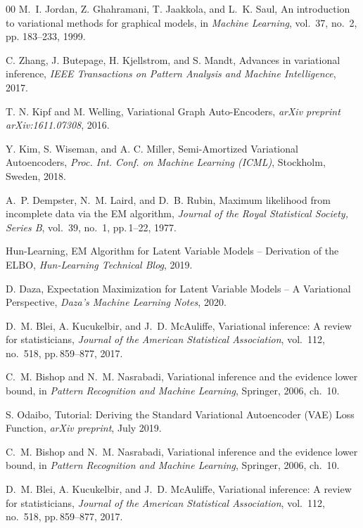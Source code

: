 \documentclass[final]{ws-ijseke}
\begin{document}
\begin{thebibliography}{00}
M.~I. Jordan, Z. Ghahramani, T. Jaakkola, and L.~K. Saul,
An introduction to variational methods for graphical models, in
{\it Machine Learning}, vol.~37, no.~2, pp. 183--233, 1999.

C. Zhang, J. Butepage, H. Kjellstrom, and S. Mandt,
Advances in variational inference,
{\it IEEE Transactions on Pattern Analysis and Machine Intelligence}, 2017.

T. N. Kipf and M. Welling,
Variational Graph Auto-Encoders,
{\it arXiv preprint arXiv:1611.07308}, 2016.

Y. Kim, S. Wiseman, and A. C. Miller,
Semi-Amortized Variational Autoencoders,
{\it Proc. Int. Conf. on Machine Learning (ICML)}, Stockholm, Sweden, 2018.

A.~P. Dempster, N.~M. Laird, and D.~B. Rubin,
Maximum likelihood from incomplete data via the EM algorithm,
{\it Journal of the Royal Statistical Society, Series B}, vol.~39, no.~1, pp. 1–22, 1977.

Hun-Learning,
EM Algorithm for Latent Variable Models – Derivation of the ELBO,
{\it Hun-Learning Technical Blog}, 2019.

D. Daza,
Expectation Maximization for Latent Variable Models – A Variational Perspective,
{\it Daza’s Machine Learning Notes}, 2020.

D.~M. Blei, A. Kucukelbir, and J.~D. McAuliffe,
Variational inference: A review for statisticians,
{\it Journal of the American Statistical Association}, vol.~112, no.~518, pp. 859–877, 2017.

C.~M. Bishop and N.~M. Nasrabadi,
Variational inference and the evidence lower bound, in
{\it Pattern Recognition and Machine Learning}, Springer, 2006, ch.~10.

S. Odaibo,
Tutorial: Deriving the Standard Variational Autoencoder (VAE) Loss Function,
{\it arXiv preprint}, July 2019.

C.~M. Bishop and N.~M. Nasrabadi,
Variational inference and the evidence lower bound, in
{\it Pattern Recognition and Machine Learning}, Springer, 2006, ch.~10.

D.~M. Blei, A. Kucukelbir, and J.~D. McAuliffe,
Variational inference: A review for statisticians,
{\it Journal of the American Statistical Association}, vol.~112, no.~518, pp. 859–877, 2017.


\end{thebibliography}
\end{document}
